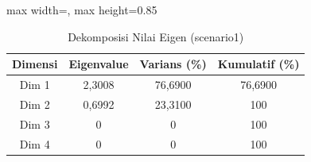 \begin{table}[H]
\centering
\caption{Dekomposisi Nilai Eigen (scenario1)} \label{tab:sample1eigen}
\begin{adjustbox}{max width=\textwidth, max height=0.85\textheight}
\begin{tabular}{|c|c|c|c|}
\hline
\textbf{Dimensi} & \textbf{Eigenvalue} & \textbf{Varians (\%)} & \textbf{Kumulatif (\%)} \\
\hline
Dim 1 & 2,3008 & 76,6900 & 76,6900 \\
Dim 2 & 0,6992 & 23,3100 & 100 \\
Dim 3 & 0 & 0 & 100 \\
Dim 4 & 0 & 0 & 100 \\
\hline
\end{tabular}
\end{adjustbox}
\end{table}